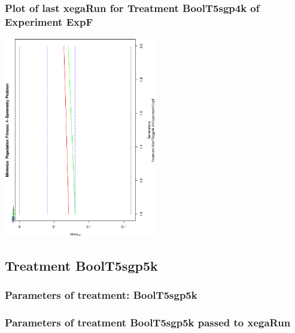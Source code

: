 \documentclass[18pt,c]{beamer}
\begin{document}
 \begin{frame}
 \frametitle{ Plot of last xegaRun for Treatment BoolT5sgp4k of Experiment ExpF }
 \begin{center}
\includegraphics[width=0.5\textwidth, angle=-90]
{ExpFPlotPopStatsFigure005.eps}
 \end{center}
 \label{report/ExpFPlotPopStatsFigure005.eps}  
 \end{frame}

\clearpage
\subsection{Treatment BoolT5sgp5k}

 \begin{frame}
 \fontsize{8pt}{9pt}\selectfont
 \frametitle{  Parameters of treatment: BoolT5sgp5k 
 }

 \label{ExpFtParmTable024.tex}  
 \end{frame}


 \begin{frame}
 \fontsize{8pt}{9pt}\selectfont
 \frametitle{  Parameters of treatment BoolT5sgp5k passed to xegaRun
 }

 \label{ExpFtParmTable025.tex}  
 \end{frame}
\end{document}
